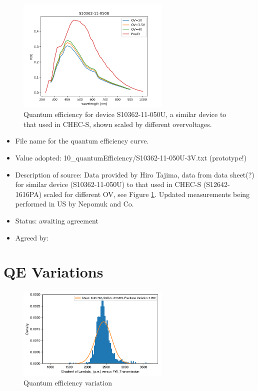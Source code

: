\documentclass[GCT,short]{gct}
\begin{document}
\begin{figure}[h!]
\centering
\includegraphics[width=0.65\textwidth]{../10_quantumEfficiency/pde_S10362-11-050U-scaled.png}
\caption{Quantum efficiency for device S10362-11-050U, a similar device to that used in CHEC-S, shown scaled by different overvoltages.}
\label{fig:pde}
\end{figure}

\begin{itemize}
\item File name for the quantum efficiency curve.
\item Value adopted: 10\_quantumEfficiency/S10362-11-050U-3V.txt (prototype!)
\item Description of source: Data provided by Hiro Tajima, data from data sheet(?) for similar device (S10362-11-050U) to that used in CHEC-S (S12642-1616PA) scaled for different OV, see Figure \ref{fig:pde}. Updated measurements being performed in US by Nepomuk and Co.
\item Status: \color{orange}awaiting agreement\color{black}
\item Agreed by: 
\end{itemize}


\section{QE Variations}

\begin{figure}[h!]
\centering
\includegraphics[width=0.65\textwidth]{../11_qeVariation/checs_qe_variation_v2.pdf}
\caption{Quantum efficiency variation}
\label{fig:qevar}
\end{figure}
\end{document}
